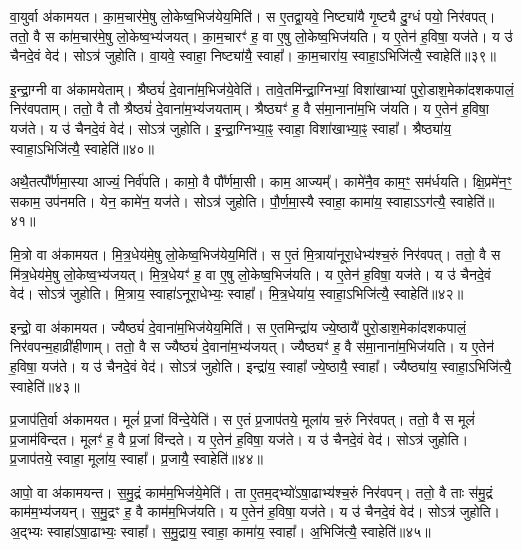 वा॒युर्वा अ॑कामयत।
का॒म॒चार॑मे॒षु लो॒केष्व॒भिज॑येय॒मिति॑।
स ए॒तद्वा॒यवे॒ निष्ट्या॑यै गृ॒ष्ट्यै दु॒ग्धं पयो॒ निर॑वपत्।
ततो॒ वै स का॑म॒चार॑मे॒षु लो॒केष्व॒भ्य॑जयत्।
का॒म॒चारꣳ॑ ह॒ वा ए॒षु लो॒केष्व॒भिज॑यति।
य ए॒तेन॑ ह॒विषा॒ यज॑ते।
य उ॑ चैनदे॒वं वेद॑।
सोऽत्र॑ जुहोति।
वा॒यवे॒ स्वाहा॒ निष्ट्या॑यै॒ स्वाहा᳚।
का॒म॒चारा॑य॒ स्वाहा॒\-ऽभिजि॑त्यै॒ स्वाहेति॑॥३९॥

इ॒न्द्रा॒ग्नी वा अ॑कामयेताम्।
श्रैष्ठ्यं॑ दे॒वाना॑म॒भिज॑ये॒वेति॑।
तावे॒तमि॑न्द्रा॒ग्निभ्यां॒ विशा॑खाभ्यां पुरो॒डाश॒मेका॑\-दश\-कपालं॒ निर॑वपताम्।
ततो॒ वै तौ श्रैष्ठ्यं॑ दे॒वाना॑म॒भ्य॑जयताम्।
श्रैष्ठ्यꣳ॑ ह॒ वै स॑मा॒नाना॑म॒भि ज॑यति।
य ए॒तेन॑ ह॒विषा॒ यज॑ते।
य उ॑ चैनदे॒वं वेद॑।
सोऽत्र॑ जुहोति।
इ॒न्द्रा॒ग्निभ्या॒ꣴ॒ स्वाहा॒ विशा॑खाभ्या॒ꣴ॒ स्वाहा᳚।
श्रैष्ठ्या॑य॒ स्वाहा॒\-ऽभिजि॑त्यै॒ स्वाहेति॑॥४०॥

अथै॒तत्पौ᳚र्णमा॒स्या आज्यं॒ निर्व॑पति।
कामो॒ वै पौ᳚र्णमा॒सी।
काम॒ आज्यम्᳚।
कामे॑नै॒व काम॒ꣳ॒ सम॑र्धयति।
क्षि॒प्रमे॑न॒ꣳ॒ सकाम॒ उप॑नमति।
येन॒ कामे॑न॒ यज॑ते।
सोऽत्र॑ जुहोति।
पौ॒र्ण॒मा॒स्यै स्वाहा॒ कामा॑य॒ स्वाहा\-ऽऽग॑त्यै॒ स्वाहेति॑॥४१॥\anuvakamend[अ॒ग्निः पञ्च॑दश प्र॒जा\-प॑तिः॒ षोड॑श॒ सोम॒ एका॑दश रु॒द्रो दश॒र्क्षैका॑दश॒ बृह॒स्पति॒र्दश॑ देवासु॒रा नव॑ पि॒तर॒ एका॑दशार्य॒मा भगो॒ दश॑ दश सवि॒ता चतु॑र्दश॒ त्वष्टा॑ वा॒युरि॑न्द्रा॒ग्नी दश॑ द॒शाथै॒तत्पौ᳚र्णमा॒स्या अ॒ष्टौ पञ्च॑दश]

मि॒त्रो वा अ॑कामयत।
मि॒त्र॒धेय॑मे॒षु लो॒केष्व॒भिज॑येय॒मिति॑।
स ए॒तं मि॒त्राया॑नूरा॒धेभ्य॑श्च॒रुं निर॑वपत्।
ततो॒ वै स मि॑त्र॒धेय॑मे॒षु लो॒केष्व॒भ्य॑जयत्।
मि॒त्र॒धेयꣳ॑ ह॒ वा ए॒षु लो॒केष्व॒भिज॑यति।
य ए॒तेन॑ ह॒विषा॒ यज॑ते।
य उ॑ चैनदे॒वं वेद॑।
सोऽत्र॑ जुहोति।
मि॒त्राय॒ स्वाहा॑\-ऽनूरा॒धेभ्यः॒ स्वाहा᳚।
मि॒त्र॒धेया॑य॒ स्वाहा॒\-ऽभिजि॑त्यै॒ स्वाहेति॑॥४२॥

इन्द्रो॒ वा अ॑कामयत।
ज्यैष्ठ्यं॑ दे॒वाना॑म॒भिज॑येय॒मिति॑।
स ए॒तमिन्द्रा॑य ज्ये॒ष्ठायै॑ पुरो॒डाश॒मेका॑\-दश\-कपालं॒ निर॑वपन्म॒हाव्री॑हीणाम्।
ततो॒ वै स ज्यैष्ठ्यं॑ दे॒वाना॑म॒भ्य॑जयत्।
ज्यैष्ठ्यꣳ॑ ह॒ वै स॑मा॒नाना॑म॒भिज॑यति।
य ए॒तेन॑ ह॒विषा॒ यज॑ते।
य उ॑ चैनदे॒वं वेद॑।
सोऽत्र॑ जुहोति।
इन्द्रा॑य॒ स्वाहा᳚ ज्ये॒ष्ठायै॒ स्वाहा᳚।
ज्यैष्ठ्या॑य॒ स्वाहा॒ऽभिजि॑त्यै॒ स्वाहेति॑॥४३॥

प्र॒जा\-प॑ति॒र्वा अ॑कामयत।
मूलं॑ प्र॒जां वि॑न्दे॒येति॑।
स ए॒तं प्र॒जा\-प॑तये॒ मूला॑य च॒रुं निर॑वपत्।
ततो॒ वै स मूलं॑ प्र॒जाम॑विन्दत।
मूलꣳ॑ ह॒ वै प्र॒जां वि॑न्दते।
य ए॒तेन॑ ह॒विषा॒ यज॑ते।
य उ॑ चैनदे॒वं वेद॑।
सोऽत्र॑ जुहोति।
प्र॒जा\-प॑तये॒ स्वाहा॒ मूला॑य॒ स्वाहा᳚।
प्र॒जायै॒ स्वाहेति॑॥४४॥

आपो॒ वा अ॑कामयन्त।
स॒मु॒द्रं काम॑म॒भिज॑ये॒मेति॑।
ता ए॒तम॒द्भ्यो॑\-ऽषा॒ढाभ्य॑श्च॒रुं निर॑वपन्।
ततो॒ वै ताः स॑मु॒द्रं काम॑म॒भ्य॑जयन्।
स॒मु॒द्रꣳ ह॒ वै काम॑म॒भिज॑यति।
य ए॒तेन॑ ह॒विषा॒ यज॑ते।
य उ॑ चैनदे॒वं वेद॑।
सोऽत्र॑ जुहोति।
अ॒द्भ्यः स्वाहा॑\-ऽषा॒ढाभ्यः॒ स्वाहा᳚।
स॒मु॒द्राय॒ स्वाहा॒ कामा॑य॒ स्वाहा᳚।
अ॒भिजि॑त्यै॒ स्वाहेति॑॥४५॥

